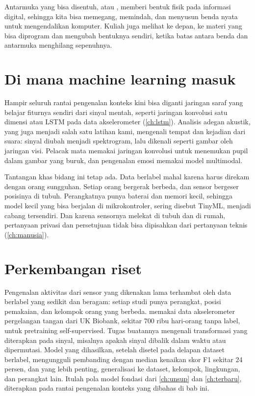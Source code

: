 Antarmuka yang bisa disentuh, atau , memberi bentuk fisik pada informasi digital, sehingga
kita bisa memegang, memindah, dan menyusun benda nyata untuk mengendalikan komputer. Kuliah juga melihat ke depan, ke
materi yang bisa diprogram dan mengubah bentuknya sendiri, ketika batas antara benda dan antarmuka menghilang
sepenuhnya.

\section{Di mana machine learning masuk}

Hampir seluruh rantai pengenalan konteks kini bisa diganti jaringan saraf yang belajar fiturnya sendiri dari sinyal
mentah, seperti jaringan konvolusi satu dimensi atau LSTM pada data akselerometer (\cref{ch:lstm}). Analisis adegan
akustik, yang juga menjadi salah satu latihan kami, mengenali tempat dan kejadian dari suara: sinyal diubah menjadi
spektrogram, lalu dikenali seperti gambar oleh jaringan visi. Pelacak mata memakai jaringan konvolusi untuk menemukan
pupil dalam gambar yang buruk, dan pengenalan emosi memakai model multimodal.

Tantangan khas bidang ini tetap ada. Data berlabel mahal karena harus direkam dengan orang sungguhan. Setiap orang
bergerak berbeda, dan sensor bergeser posisinya di tubuh. Perangkatnya punya baterai dan memori kecil, sehingga model
kecil yang bisa berjalan di mikrokontroler, sering disebut TinyML, menjadi cabang tersendiri. Dan karena sensornya
melekat di tubuh dan di rumah, pertanyaan privasi dan persetujuan tidak bisa dipisahkan dari pertanyaan teknis
(\cref{ch:manusia}).

\section{Perkembangan riset}

Pengenalan aktivitas dari sensor yang dikenakan lama terhambat oleh data berlabel yang sedikit dan beragam: setiap studi
punya perangkat, posisi pemakaian, dan kelompok orang yang berbeda. \citet{yuan2024} memakai data akselerometer pergelangan
tangan dari UK Biobank, sekitar 700 ribu hari-orang tanpa label, untuk pretraining self-supervised. Tugas buatannya
mengenali transformasi yang diterapkan pada sinyal, misalnya apakah sinyal dibalik dalam waktu atau dipermutasi. Model
yang dihasilkan, setelah disetel pada delapan dataset berlabel, mengungguli pembanding dengan median kenaikan skor F1
sekitar 24 persen, dan yang lebih penting, generalisasi ke dataset, kelompok, lingkungan, dan perangkat lain. Itulah
pola model fondasi dari \cref{ch:unsup} dan \cref{ch:terbaru}, diterapkan pada rantai pengenalan konteks yang dibahas di bab
ini.

